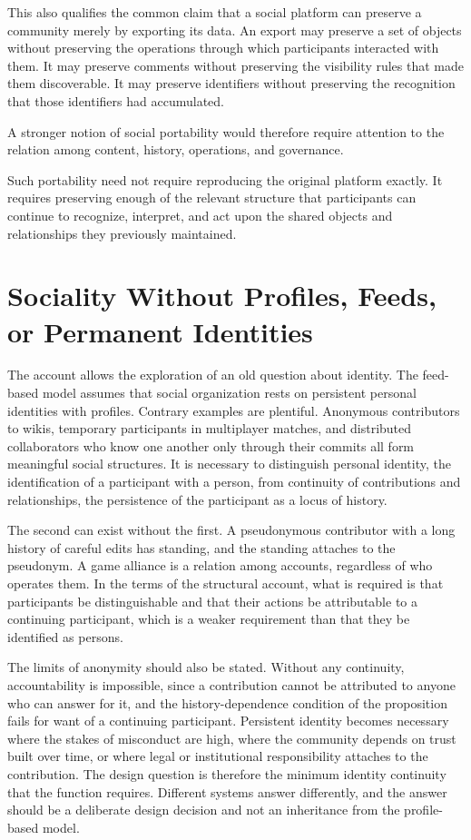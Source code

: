\documentclass[11pt]{article}
\theoremstyle{remark}
\begin{document}
This also qualifies the common claim that a social
platform can preserve a community merely by exporting
its data. An export may preserve a set of objects
without preserving the operations through which
participants interacted with them. It may preserve
comments without preserving the visibility rules
that made them discoverable. It may preserve
identifiers without preserving the recognition
that those identifiers had accumulated.

A stronger notion of social portability would
therefore require attention to the relation among
content, history, operations, and governance.

Such portability need not require reproducing the
original platform exactly. It requires preserving
enough of the relevant structure that participants
can continue to recognize, interpret, and act upon
the shared objects and relationships they previously
maintained.


\section{Sociality Without Profiles, Feeds, or Permanent Identities}

The account allows the exploration of an old question about identity. The feed-based model assumes that social organization rests on persistent personal identities with profiles. Contrary examples are plentiful. Anonymous contributors to wikis, temporary participants in multiplayer matches, and distributed collaborators who know one another only through their commits all form meaningful social structures. It is necessary to distinguish personal identity, the identification of a participant with a person, from continuity of contributions and relationships, the persistence of the participant as a locus of history.

The second can exist without the first. A pseudonymous contributor with a long history of careful edits has standing, and the standing attaches to the pseudonym. A game alliance is a relation among accounts, regardless of who operates them. In the terms of the structural account, what is required is that participants be distinguishable and that their actions be attributable to a continuing participant, which is a weaker requirement than that they be identified as persons.

The limits of anonymity should also be stated. Without any continuity, accountability is impossible, since a contribution cannot be attributed to anyone who can answer for it, and the history-dependence condition of the proposition fails for want of a continuing participant. Persistent identity becomes necessary where the stakes of misconduct are high, where the community depends on trust built over time, or where legal or institutional responsibility attaches to the contribution. The design question is therefore the minimum identity continuity that the function requires. Different systems answer differently, and the answer should be a deliberate design decision and not an inheritance from the profile-based model.
\end{document}
